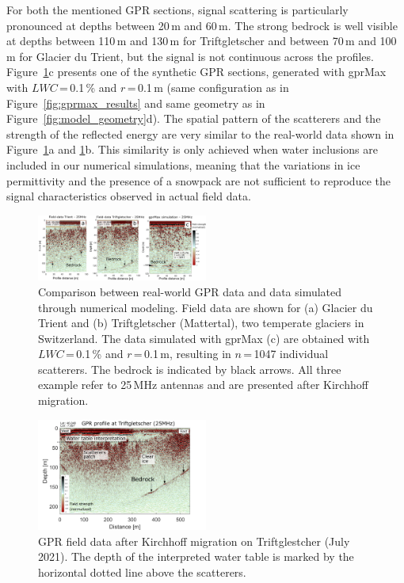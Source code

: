 For both the mentioned GPR sections, signal scattering is particularly pronounced at depths between 20\,m and 60\,m. The strong bedrock is well visible at depths between 110\,m and 130\,m for Triftgletscher and between 70\,m and 100\,m for Glacier du Trient, but the signal is not continuous across the profiles. Figure~\ref{fig:field_vs_gprmax}c presents one of the synthetic GPR sections, generated with gprMax with $LWC$\,=\,0.1\,\% and $r$\,=\,0.1\,m (same configuration as in Figure~\ref{fig:gprmax_results} and same geometry as in Figure~\ref{fig:model_geometry}d). The spatial pattern of the scatterers and the strength of the reflected energy are very similar to the real-world data shown in Figure~\ref{fig:field_vs_gprmax}a and \ref{fig:field_vs_gprmax}b. This similarity is only achieved when water inclusions are included in our numerical simulations, meaning that the variations in ice permittivity and the presence of a snowpack are not sufficient to reproduce the signal characteristics observed in actual field data. 


\begin{figure}
    \centering
    \includegraphics[width=0.5\textwidth]{chapters/chapter_gprmax/Fig05.pdf}
    \caption{Comparison between real-world GPR data and data simulated through numerical modeling. Field data are shown for (a) Glacier du Trient and (b) Triftgletscher (Mattertal), two temperate glaciers in Switzerland. The data simulated with gprMax (c) are obtained with $LWC$\,=\,0.1\,\% and $r$\,=\,0.1\,m, resulting in $n$\,=\,1047 individual scatterers. The bedrock is indicated by black arrows. All three example refer to 25\,MHz antennas and are presented after Kirchhoff migration.}
    \label{fig:field_vs_gprmax}
\end{figure}


\begin{figure}
    \centering
    \includegraphics[width=0.5\textwidth]{chapters/chapter_gprmax/Fig06.pdf}
    \caption{GPR field data after Kirchhoff migration on Triftglestcher (July 2021). The depth of the interpreted water table is marked by the horizontal dotted line above the scatterers.}
    \label{fig:trift}
\end{figure}

